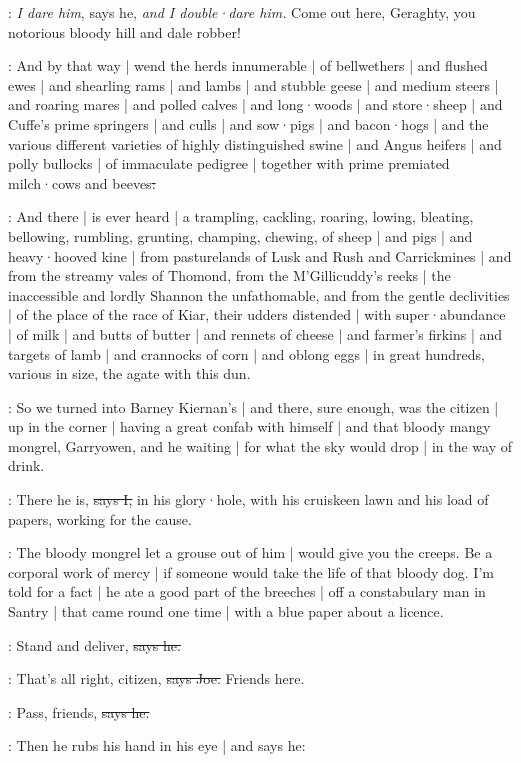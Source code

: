 \Nq:
\emph{I dare him},
says he,
\emph{and I double·dare him.}
Come out here,
Geraghty,
you notorious bloody hill and dale robber!

:
And by that way |
wend the herds innumerable |
of bellwethers |
and flushed ewes |
and shearling rams |
and lambs |
and stubble geese |
and medium steers |
and roaring mares |
and polled calves |
and long·woods |
and store·sheep |
and Cuffe's prime springers |
and culls |
and sow·pigs |
and bacon·hogs |
and the various different varieties of highly distinguished swine |
and Angus heifers |
and polly bullocks |
of immaculate pedigree |
together with prime premiated milch·cows and beeves\sout{:}

:
And there |
is ever heard |
a trampling,
cackling,
roaring,
lowing,
bleating,
bellowing,
rumbling,
grunting,
champing,
chewing,
of sheep |
and pigs |
and heavy·hooved kine |
from pasturelands of Lusk and Rush and Carrickmines |
and from the streamy vales of Thomond,
from the M'Gillicuddy's reeks |
the inaccessible and lordly Shannon the unfathomable,
and from the gentle declivities |
of the place of the race of Kiar,
their udders distended |
with super·abundance |
of milk |
and butts of butter |
and rennets of cheese |
and farmer's firkins |
and targets of lamb |
and crannocks of corn |
and oblong eggs |
in great hundreds,
various in size,
the agate with this dun.

\Nq:
So we turned into Barney Kiernan's |
and there,
sure enough,
was the citizen |
up in the corner |
having a great confab with himself |
and that bloody mangy mongrel,
Garryowen,
and he waiting |
for what the sky would drop |
in the way of drink.

:
There he is,
\sout{says I,}
in his glory·hole,
with his cruiskeen lawn and his load of papers,
working for the cause.

\Nq:
The bloody mongrel let a grouse out of him |
would give you the creeps.
Be a corporal work of mercy |
if someone would take the life of that bloody dog.
I'm told for a fact |
he ate a good part of the breeches |
off a constabulary man in Santry |
that came round one time |
with a blue paper about a licence.

\citizen:
Stand and deliver,
\sout{says he.}

\joe:
That's all right,
citizen,
\sout{says Joe.}
Friends here.

\citizen:
Pass,
friends,
\sout{says he.}

\Nq:
Then he rubs his hand in his eye |
and says he:

